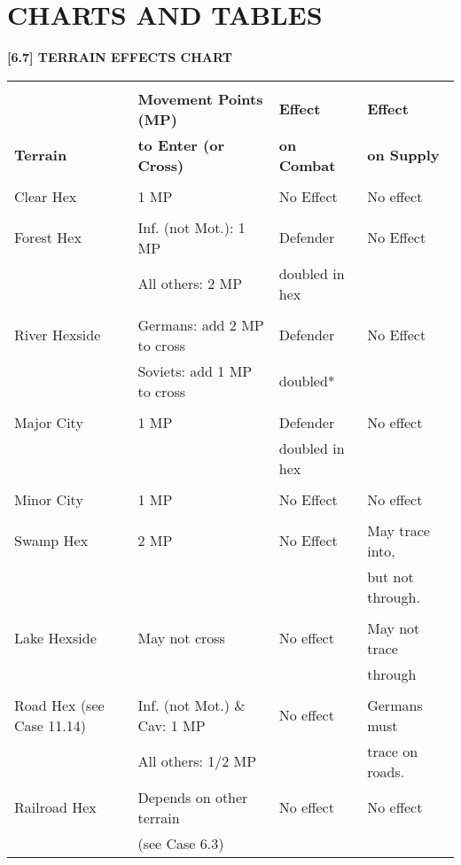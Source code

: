\pagebreak
\section{CHARTS AND TABLES}

\textbf{[6.7] TERRAIN EFFECTS CHART}

\begin{tabular}{|llll|}
  \hline & & &\\[-2.0ex]
  & \textbf{Movement Points (MP)} & \textbf{Effect} & \textbf{Effect}\\
  \textbf{Terrain} & \textbf{to Enter (or Cross)} & \textbf{on Combat} & \textbf{on Supply}\\
  \hline & & &\\[-2.0ex]
  Clear Hex & 1 MP & No Effect & No effect\\
  \hline & & &\\[-2.0ex]
  Forest Hex & Inf. (not Mot.): 1 MP & Defender & No Effect\\
  & All others: 2 MP & doubled in hex &\\
  \hline & & &\\[-2.0ex]
  River Hexside & Germans: add 2 MP to cross & Defender & No Effect\\
  & Soviets: add 1 MP to cross & doubled* &\\
  \hline & & &\\[-2.0ex]
  Major City & 1 MP & Defender & No effect\\
  & & doubled in hex &\\
  \hline & & &\\[-2.0ex]
  Minor City & 1 MP & No Effect & No effect\\
  \hline & & &\\[-2.0ex]
  Swamp Hex & 2 MP & No Effect & May trace into,\\
  & & & but not through.\\
  \hline & & &\\[-2.0ex]
  Lake Hexside & May not cross & No effect & May not trace\\
  & & & through\\
  \hline & & &\\[-2.0ex]
  Road Hex (see Case 11.14)& Inf. (not Mot.) \& Cav: 1 MP & No effect & Germans must\\
  & All others: 1/2 MP & & trace on roads.\\
  \hline
  Railroad Hex & Depends on other terrain & No effect & No effect\\
  & (see Case 6.3) & &\\
  \hline
\end{tabular}

